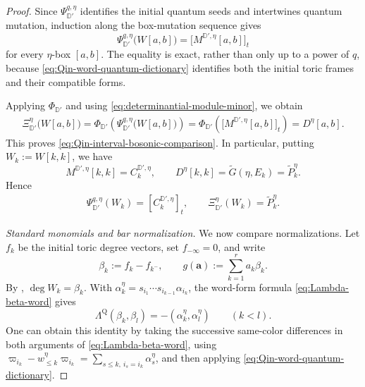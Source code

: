 \documentclass[12pt, reqno]{amsart}
\theoremstyle{plain}
\theoremstyle{definition}
\numberwithin{equation}{section}
\newcommand{\DD}{\mathbb{D}}
\begin{document}
\begin{proof}
Since \(\Psi_{\DD'}^{q,\eta}\) identifies the initial quantum seeds
and intertwines quantum mutation, induction along the box-mutation
sequence gives
\[
    \Psi_{\DD'}^{q,\eta}\bigl(W[a,b]\bigr)
    =
    \bigl[M^{\DD',\eta}[a,b]\bigr]_t
\]
for every \(\eta\)-box \([a,b]\). The equality is exact, rather
than only up to a power of \(q\), because
\eqref{eq:Qin-word-quantum-dictionary} identifies both the initial
toric frames and their compatible forms.

Applying \(\Phi_{\DD'}\) and using
\eqref{eq:determinantial-module-minor}, we obtain
\[
\begin{aligned}
    \Xi_{\DD'}^\eta\bigl(W[a,b]\bigr)
    =
    \Phi_{\DD'}\left(
       \Psi_{\DD'}^{q,\eta}\bigl(W[a,b]\bigr)
    \right)
    =
    \Phi_{\DD'}\left(
       \bigl[M^{\DD',\eta}[a,b]\bigr]_t
    \right)
    =
    D^\eta[a,b].
\end{aligned}
\]
This proves \eqref{eq:Qin-interval-bosonic-comparison}.
In particular, putting \(W_k:=W[k,k]\), we have
\[
    M^{\DD',\eta}[k,k]=C_k^{\DD',\eta},
    \qquad
    D^\eta[k,k]
    =
    \widetilde G(\eta,E_k)
    =
    \widetilde P_k^\eta.
\]
Hence
\begin{equation}\label{eq:Qin-singleton-bosonic-comparison}
\begin{aligned}
    \Psi_{\DD'}^{q,\eta}(W_k)
    =[C_k^{\DD',\eta}]_t,\qquad
    \Xi_{\DD'}^\eta(W_k)
    =\widetilde P_k^\eta.
\end{aligned}
\end{equation}

\smallskip
\noindent\emph{Standard monomials and bar normalization.}
We now compare normalizations.  Let \(f_k\) be the initial toric
degree vectors, set \(f_{-\infty}=0\), and write
\[
 \beta_k:=f_k-f_{k^-},\qquad
 g(\mathbf a):=\sum_{k=1}^r a_k\beta_k.
\]
By \cite[Lemma~8.4]{qin2024analogs}, \(\deg W_k=\beta_k\).
With \(\alpha_k^\eta=s_{i_1}\cdots s_{i_{k-1}}\alpha_{i_k}\),
the word-form formula \eqref{eq:Lambda-beta-word} gives
\begin{equation}\label{eq:Qin-root-degree-form}
 \Lambda^{\mathrm Q}(\beta_k,\beta_l)
 =-(\alpha_k^\eta,\alpha_l^\eta)\qquad(k<l).
\end{equation}
One can obtain this identity by taking the successive same-color
differences in both arguments of \eqref{eq:Lambda-beta-word},
using
\(\varpi_{i_k}-w_{\leq k}^\eta\varpi_{i_k}
 =\sum_{s\leq k,\ i_s=i_k}\alpha_s^\eta\), and then applying
\eqref{eq:Qin-word-quantum-dictionary}.


\end{proof}
\end{document}
